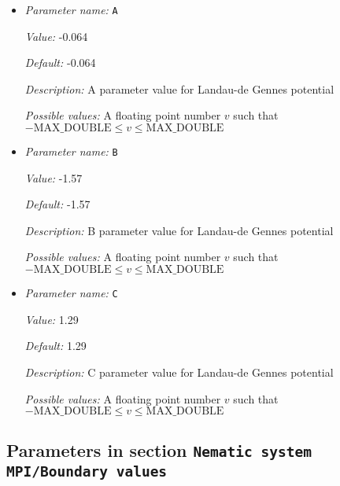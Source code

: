 \begin{itemize}
\item {\it Parameter name:} {\tt A}
\label{parameters:Nematic system MPI/Field theory/Landau_2dde gennes/A}
\label{parameters:Nematic_20system_20MPI/Field_20theory/Landau_2dde_20gennes/A}


{\it Value:} -0.064


{\it Default:} -0.064


{\it Description:} A parameter value for Landau-de Gennes potential


{\it Possible values:} A floating point number $v$ such that $-\text{MAX\_DOUBLE} \leq v \leq \text{MAX\_DOUBLE}$
\item {\it Parameter name:} {\tt B}
\label{parameters:Nematic system MPI/Field theory/Landau_2dde gennes/B}
\label{parameters:Nematic_20system_20MPI/Field_20theory/Landau_2dde_20gennes/B}


{\it Value:} -1.57


{\it Default:} -1.57


{\it Description:} B parameter value for Landau-de Gennes potential


{\it Possible values:} A floating point number $v$ such that $-\text{MAX\_DOUBLE} \leq v \leq \text{MAX\_DOUBLE}$
\item {\it Parameter name:} {\tt C}
\label{parameters:Nematic system MPI/Field theory/Landau_2dde gennes/C}
\label{parameters:Nematic_20system_20MPI/Field_20theory/Landau_2dde_20gennes/C}


{\it Value:} 1.29


{\it Default:} 1.29


{\it Description:} C parameter value for Landau-de Gennes potential


{\it Possible values:} A floating point number $v$ such that $-\text{MAX\_DOUBLE} \leq v \leq \text{MAX\_DOUBLE}$
\end{itemize}

\subsection{Parameters in section \tt Nematic system MPI/Boundary values}
\label{parameters:Nematic_20system_20MPI/Boundary_20values}

